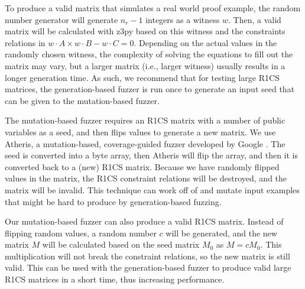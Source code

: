 To produce a valid matrix that simulates a real world proof example, the random number generator will generate $n_r - 1$ integers as a witness $w$. Then, a valid matrix will be calculated with z3py based on this witness and the constraints relations in $w \cdot A \times w \cdot B - w \cdot C = 0$. Depending on the actual values in the randomly chosen witness, the complexity of solving the equations to fill out the matrix may vary, but a larger matrix (i.e., larger witness) usually results in a longer generation time.  As such, we recommend that for testing large R1CS matrices, the generation-based fuzzer is run once to generate an input seed that can be given to the mutation-based fuzzer.

The mutation-based fuzzer requires an R1CS matrix with a number of public variables as a seed, and then flips values to generate a new matrix. We use Atheris, a mutation-based, coverage-guided fuzzer developed by Google \cite{atheris}. The seed is converted into a byte array, then Atheris will flip the array, and then it is converted back to a (new) R1CS matrix.  Because we have randomly flipped values in the matrix, the R1CS constraint relations will be destroyed, and the matrix will be invalid.  This technique can work off of and mutate input examples that might be hard to produce by generation-based fuzzing.

Our mutation-based fuzzer can also produce a valid R1CS matrix. Instead of flipping random values, a random number $c$ will be generated, and the new matrix $M$ will be calculated based on the seed matrix $M_0$ as $M = c M_0$.
This multiplication will not break the constraint relations, so the new matrix is still valid.  This can be used with the generation-based fuzzer to produce valid large R1CS matrices in a short time, thus increasing performance.




